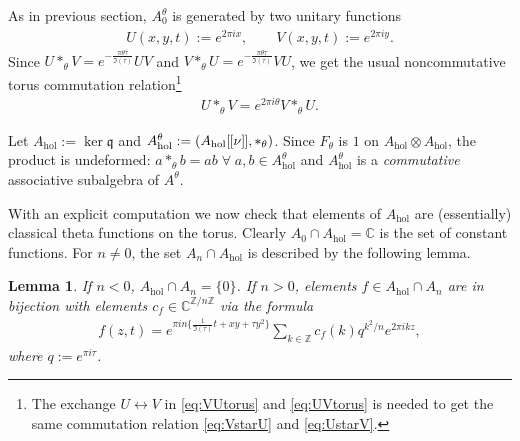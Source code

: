 \documentclass[pdftex]{sigma}
\numberwithin{equation}{section}
\newtheorem{lem}[thm]{Lemma}
\theoremstyle{definition}
\newcommand{\C}{\mathbb{C}}
\newcommand{\Z}{\mathbb{Z}}
\newcommand{\mf}{\mathfrak}
\newcommand{\lbrak}{[\hspace{-0.5pt}[}
\newcommand{\rbrak}{]\hspace{-0.5pt}]}
\newcommand{\gb}{\mf{q}}
\renewcommand{\hbar}{\nu}
\begin{document}
As in previous section, $A_0^\theta$ is generated by two unitary functions
\begin{gather}\label{eq:UVtorus}
U(x,y,t):=e^{2\pi ix} ,\qquad
V(x,y,t):=e^{2\pi iy} .
\end{gather}
Since $U\ast_\theta V=e^{-\frac{\pi\theta\bar\tau}{\Im(\tau)}}UV$
and
$V\ast_\theta U=e^{-\frac{\pi\theta\tau}{\Im(\tau)}}VU$, we get the usual noncommutative torus commutation relation\footnote{The exchange
$U\leftrightarrow V$ in \eqref{eq:VUtorus} and \eqref{eq:UVtorus} is needed
to get the same commutation relation \eqref{eq:VstarU} and \eqref{eq:UstarV}.}
\begin{gather}\label{eq:UstarV}
U\ast_\theta V=e^{2\pi i\theta} V\ast_\theta U .
\end{gather}

Let $A_{\mathrm{hol}}:=\ker\gb$
and $A_{\mathrm{hol}}^\theta:=(A_{\mathrm{hol}}\lbrak\hbar\rbrak,\ast_\theta)$. Since $F_\theta$ is $1$ on $A_{\mathrm{hol}}\otimes A_{\mathrm{hol}}$, the product is undeformed: $a\ast_\theta b=ab\;\forall\;a,b\in A_{\mathrm{hol}}^\theta$ and $A_{\mathrm{hol}}^\theta$ is a \emph{commutative} associative subalgebra of $A^\theta$.

With an explicit computation we now check that elements of
$A_{\mathrm{hol}}$ are (essentially) classical theta functions on the torus.
Clearly $A_0\cap A_{\mathrm{hol}}=\C$ is the set of constant functions.
For $n\neq 0$, the set $A_n\cap A_{\mathrm{hol}}$ is described by the following lemma.

\begin{lem}
If $n<0$, $A_{\mathrm{hol}}\cap A_n=\{0\}$. If $n>0$, elements $f\in A_{\mathrm{hol}}\cap A_n$ are in bijection with elements $c_f\in\C^{\Z/n\Z}$ via the formula
\begin{gather}\label{eq:theta}
f(z,t)=e^{\pi in\{\frac{1}{\Im(\tau)}t+xy+\tau y^2\}}
\sum_{k\in\Z}c_f(k)q^{k^2/n}e^{2\pi ikz} ,
\end{gather}
where $q:=e^{\pi i\tau}$.
\end{lem}
\end{document}
